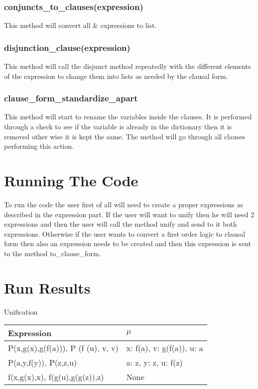 {\subsubsection{conjuncts\_to\_clauses(expression)}
This method will convert all \& expressions to list.
\subsubsection{disjunction\_clause(expression)}
This method will call the disjunct method repeatedly with the different elements of the expression to change them into lists as needed by the clausal form.
\subsubsection{clause\_form\_standardize\_apart}
This method will start to rename the variables inside the clauses. It is performed through a check to see if the variable is already in the dictionary then it is removed other wise it is kept the same. The method will go through all clauses performing this action.
\section{Running The Code}
To run the code the user first of all will need to create a proper expressions as described in the expression part. If the user will want to unify then he will need 2 expressions and then the user will call the method unify and send to it both expressions. Otherwise if the user wants to convert a first order logic to clausal form then also an expression needs to be created and then this expression is sent to the method to\_clause\_form.

\section{Run Results}
\begin{center}
Unification
\end{center}
\begin{table}[htb]
\begin{tabular}{| p{7cm}  | p{7cm} | }
 \hline
Expression  & $\mu$
\\ \hline
P(x,g(x),g(f(a))), P (f (u), v, v) & x: f(a), v: g(f(a)), u: a
\\ \hline
P(a,y,f(y)), P(z,z,u) & a: z, y: z, u: f(z)
\\ \hline
f(x,g(x),x), f(g(u),g(g(z)),z) & None
\\ \hline
\end{tabular}
\end{table}

}
